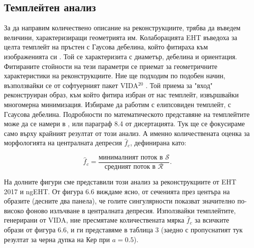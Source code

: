 \documentclass[12pt]{article}
\numberwithin{equation}{section}
\numberwithin{figure}{section}
\begin{document}
	
	\subsection{Темплейтен анализ}

	За да направим количествено описание на реконструкциите, трябва да въведем величини, характеризиращи геометрията им. Колаборацията EHT въведоха за целта темплейт на пръстен с Гаусова дебелина, който фитираха към изображенията си \cite{EHT_M87_VI}. Той се характеризита с диаметър, дебелина и ориентация. Фитираните стойности на тези параметри се приемат за геометричните характеристики на реконструкциите. Ние ще подходим по подобен начин, възползвайки се от софтуерният пакет VIDA$^{20}$ \cite{VIDA}. Той приема за "вход"$\,$ реконструиран образ, към който фитира избран от нас темплейт, извършвайки многомерна минимизация. Избираме да работим с елипсовиден темплейт, с Гсаусова дебелина. Подробности по математическото представяне на темплейтите може да се намери в \cite{VIDA}, или параграф 8.4 от дисертацията. Тук ще се фокусираме само върху крайният резултат от този анализ. А именно количествената оценка за морфологията на централната депресия $\hat{f}_c$, дефинирана като:
	
	\begin{equation}
		\hat{f}_c = \frac{\text{минималният поток в }\mathcal{S}}{\text{средният поток в }\mathcal{R}}.
	\end{equation}
	
	 \noindent На долните фигури сме представили този анализ за реконструкциите от EHT 2017 и ngEHT. От фигура 6.6 виждаме ясно, от сеченията през центъра на образите (десните два панела), че голите сингулярности показват значително по-високо фоново излъчване в централната депресия. Използвайки темплейтите, генерирани от VIDA, ние пресмятаме количествената мярка $\hat{f}_c$ за всичките образи от фигура 6.6, и ги представяме в таблица 3 (заедно с пропуснатият тук резултат за черна дупка на Кер при $a = 0.5$).
	 
\end{document}
